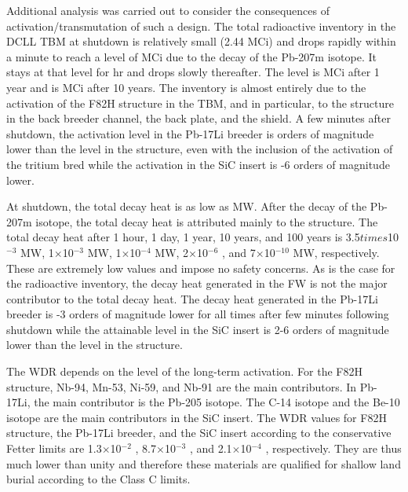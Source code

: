 Additional analysis was carried out to consider the consequences of
activation/transmutation of such a design.  The total radioactive inventory in
the \gls{DCLL} \gls{TBM} at shutdown is relatively small (2.44 MCi) and drops
rapidly within a minute to reach a level of  MCi due to the
decay of the Pb-207m isotope. It stays at that level for  hr and
drops slowly thereafter. The level is  MCi after 1 year and is
 MCi after 10 years. The inventory is almost entirely due to
the activation of the F82H structure in the \gls{TBM}, and in particular, to
the structure in the back breeder channel, the back plate, and the shield. A
few minutes after shutdown, the activation level in the Pb-17Li breeder is
 orders of magnitude lower than the level in the structure, even
with the inclusion of the activation of the tritium bred while the activation
in the SiC insert is -6 orders of magnitude lower.

At shutdown, the total decay heat is as low as  MW. After the
decay of the Pb-207m isotope, the total decay heat is attributed mainly to the
structure. The total decay heat after 1 hour, 1 day, 1 year, 10 years, and 100
years is 3.5$times$10$^{-3}$ MW, 1$\times$10$^{-3}$ MW, 1$\times$10$^{-4}$ MW,
2$\times$10$^{-6}$ , and 7$\times$10$^{-10}$ MW, respectively. These are
extremely low values and impose no safety concerns. As is the case for the
radioactive inventory, the decay heat generated in the \gls{FW} is not the
major contributor to the total decay heat. The decay heat generated in the
Pb-17Li breeder is -3 orders of magnitude lower for all times
after few minutes following shutdown while the attainable level in the SiC
insert is 2-6 orders of magnitude lower than the level in the structure.

The \gls{WDR} depends on the level of the long-term activation. For the F82H
structure, Nb-94, Mn-53, Ni-59, and Nb-91 are the main contributors. In Pb-
17Li, the main contributor is the Pb-205 isotope. The C-14 isotope and the
Be-10 isotope are the main contributors in the SiC insert. The \gls{WDR}
values for F82H structure, the Pb-17Li breeder, and the SiC insert according
to the conservative Fetter limits are 1.3$\times$10$^{-2}$ ,
8.7$\times$10$^{-3}$ , and 2.1$\times$10$^{-4}$ , respectively. They are thus
much lower than unity and therefore these materials are qualified for shallow
land burial according to the Class C limits.


